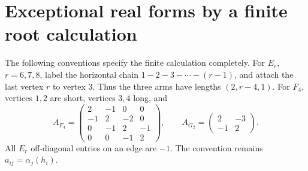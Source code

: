 \section{Exceptional real forms by a finite root calculation}

The following conventions specify the finite calculation completely.
For \(E_r\), \(r=6,7,8\), label the horizontal chain
\(1-2-3-\cdots-(r-1)\), and attach the last vertex \(r\)
to vertex \(3\). Thus the three arms have lengths
\((2,r-4,1)\). For \(F_4\), vertices \(1,2\) are short,
vertices \(3,4\) long, and
\[
 A_{F_4}=\begin{pmatrix}
 2&-1&0&0\\-1&2&-2&0\\0&-1&2&-1\\0&0&-1&2
 \end{pmatrix},\qquad
 A_{G_2}=\begin{pmatrix}2&-3\\-1&2\end{pmatrix}.
\]
All \(E_r\) off-diagonal entries on an edge are \(-1\).
The convention remains \(a_{ij}=\alpha_j(h_i)\).

